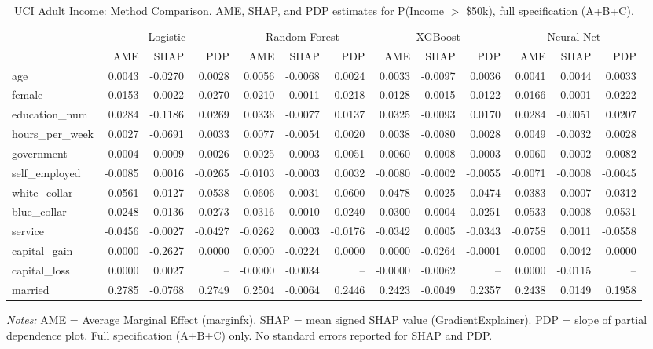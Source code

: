 \begin{table}[htbp]
\centering
\small
\begin{threeparttable}
\caption{UCI Adult Income: Method Comparison. AME, SHAP, and PDP estimates for P(Income $>$ \$50k), full specification (A+B+C).}
\label{tab:adult_method_comparison}
\begin{tabular}{lrrrrrrrrrrrr}
\toprule
 & \multicolumn{3}{c}{Logistic} & \multicolumn{3}{c}{Random Forest} & \multicolumn{3}{c}{XGBoost} & \multicolumn{3}{c}{Neural Net} \\
\cmidrule(lr){2-4} \cmidrule(lr){5-7} \cmidrule(lr){8-10} \cmidrule(lr){11-13} 
 & AME & SHAP & PDP & AME & SHAP & PDP & AME & SHAP & PDP & AME & SHAP & PDP \\
\midrule
age & 0.0043 & -0.0270 & 0.0028 & 0.0056 & -0.0068 & 0.0024 & 0.0033 & -0.0097 & 0.0036 & 0.0041 & 0.0044 & 0.0033 \\
female & -0.0153 & 0.0022 & -0.0270 & -0.0210 & 0.0011 & -0.0218 & -0.0128 & 0.0015 & -0.0122 & -0.0166 & -0.0001 & -0.0222 \\
education\_num & 0.0284 & -0.1186 & 0.0269 & 0.0336 & -0.0077 & 0.0137 & 0.0325 & -0.0093 & 0.0170 & 0.0284 & -0.0051 & 0.0207 \\
\midrule
hours\_per\_week & 0.0027 & -0.0691 & 0.0033 & 0.0077 & -0.0054 & 0.0020 & 0.0038 & -0.0080 & 0.0028 & 0.0049 & -0.0032 & 0.0028 \\
government & -0.0004 & -0.0009 & 0.0026 & -0.0025 & -0.0003 & 0.0051 & -0.0060 & -0.0008 & -0.0003 & -0.0060 & 0.0002 & 0.0082 \\
self\_employed & -0.0085 & 0.0016 & -0.0265 & -0.0103 & -0.0003 & 0.0032 & -0.0080 & -0.0002 & -0.0055 & -0.0071 & -0.0008 & -0.0045 \\
white\_collar & 0.0561 & 0.0127 & 0.0538 & 0.0606 & 0.0031 & 0.0600 & 0.0478 & 0.0025 & 0.0474 & 0.0383 & 0.0007 & 0.0312 \\
blue\_collar & -0.0248 & 0.0136 & -0.0273 & -0.0316 & 0.0010 & -0.0240 & -0.0300 & 0.0004 & -0.0251 & -0.0533 & -0.0008 & -0.0531 \\
service & -0.0456 & -0.0027 & -0.0427 & -0.0262 & 0.0003 & -0.0176 & -0.0342 & 0.0005 & -0.0343 & -0.0758 & 0.0011 & -0.0558 \\
\midrule
capital\_gain & 0.0000 & -0.2627 & 0.0000 & 0.0000 & -0.0224 & 0.0000 & 0.0000 & -0.0264 & -0.0001 & 0.0000 & 0.0042 & 0.0000 \\
capital\_loss & 0.0000 & 0.0027 & -- & -0.0000 & -0.0034 & -- & -0.0000 & -0.0062 & -- & 0.0000 & -0.0115 & -- \\
married & 0.2785 & -0.0768 & 0.2749 & 0.2504 & -0.0064 & 0.2446 & 0.2423 & -0.0049 & 0.2357 & 0.2438 & 0.0149 & 0.1958 \\
\bottomrule
\end{tabular}
\begin{tablenotes}
\footnotesize
\item \textit{Notes:} AME = Average Marginal Effect (marginfx). SHAP = mean signed SHAP value (GradientExplainer). PDP = slope of partial dependence plot. Full specification (A+B+C) only. No standard errors reported for SHAP and PDP.
\end{tablenotes}
\end{threeparttable}
\end{table}